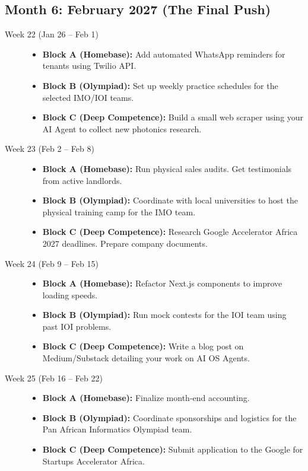 \documentclass[11pt,a4paper]{article}
\begin{document}
\subsection{Month 6: February 2027 (The Final Push)}
\begin{description}
    \item[Week 22 (Jan 26 -- Feb 1)] \hfill
    \begin{itemize}
        \item \textbf{Block A (Homebase):} Add automated WhatsApp reminders for tenants using Twilio API.
        \item \textbf{Block B (Olympiad):} Set up weekly practice schedules for the selected IMO/IOI teams.
        \item \textbf{Block C (Deep Competence):} Build a small web scraper using your AI Agent to collect new photonics research.
    \end{itemize}
    
    \item[Week 23 (Feb 2 -- Feb 8)] \hfill
    \begin{itemize}
        \item \textbf{Block A (Homebase):} Run physical sales audits. Get testimonials from active landlords.
        \item \textbf{Block B (Olympiad):} Coordinate with local universities to host the physical training camp for the IMO team.
        \item \textbf{Block C (Deep Competence):} Research Google Accelerator Africa 2027 deadlines. Prepare company documents.
    \end{itemize}
    
    \item[Week 24 (Feb 9 -- Feb 15)] \hfill
    \begin{itemize}
        \item \textbf{Block A (Homebase):} Refactor Next.js components to improve loading speeds.
        \item \textbf{Block B (Olympiad):} Run mock contests for the IOI team using past IOI problems.
        \item \textbf{Block C (Deep Competence):} Write a blog post on Medium/Substack detailing your work on AI OS Agents.
    \end{itemize}
    
    \item[Week 25 (Feb 16 -- Feb 22)] \hfill
    \begin{itemize}
        \item \textbf{Block A (Homebase):} Finalize month-end accounting.
        \item \textbf{Block B (Olympiad):} Coordinate sponsorships and logistics for the Pan African Informatics Olympiad team.
        \item \textbf{Block C (Deep Competence):} Submit application to the Google for Startups Accelerator Africa.
    \end{itemize}
    

\end{description}
\end{document}
